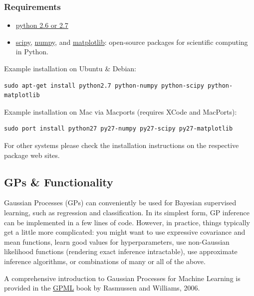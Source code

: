 \documentclass[letterpaper,10pt,english]{sphinxmanual}
\begin{document}
\subsubsection{Requirements}
\label{Install:requirements}\begin{itemize}
\item {} 
\href{http://www.python.org/}{python 2.6 or 2.7}

\item {} 
\href{http://www.scipy.org/}{scipy}, \href{http://www.numpy.org/}{numpy}, and \href{http://matplotlib.org/}{matplotlib}: open-source packages for scientific computing in Python.

\end{itemize}

Example installation on Ubuntu \& Debian:

\begin{Verbatim}[commandchars=\\\{\}]
sudo apt-get install python2.7 python-numpy python-scipy python-matplotlib
\end{Verbatim}

Example installation on Mac via Macports (requires XCode and MacPorts):

\begin{Verbatim}[commandchars=\\\{\}]
sudo port install python27 py27-numpy py27-scipy py27-matplotlib
\end{Verbatim}

For other systems please check the installation instructions on the respective package web sites.


\subsection{GPs \& Functionality}
\label{Theory:gps-functionality}\label{Theory::doc}
Gaussian Processes (GPs) can conveniently be used for Bayesian supervised learning, such as regression and classification.
In its simplest form, GP inference can be implemented in a few lines of code. However, in practice, things typically
get a little more complicated: you might want to use expressive covariance and mean functions, learn good values
for hyperparameters, use non-Gaussian likelihood functions (rendering exact inference intractable), use approximate inference
algorithms, or combinations of many or all of the above.

A comprehensive introduction to Gaussian Processes for Machine Learning is provided in the \href{http://www.gaussianprocess.org/gpml}{GPML} book by Rasmussen and Williams, 2006.
\end{document}
